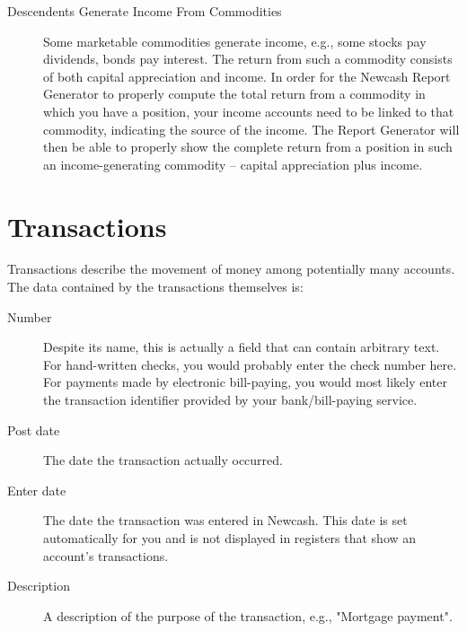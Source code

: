 \documentclass{report}
\begin{document}
\begin{description}
\begin{description}
\item [Descendents Generate Income From Commodities] Some marketable commodities generate income, e.g., some stocks pay dividends, bonds pay interest. The return from such a commodity consists of both capital appreciation and income. In order for the Newcash Report Generator to properly compute the total return from a commodity in which you have a position, your income accounts need to be linked to that commodity, indicating the source of the income. The Report Generator will then be able to properly show the complete return from a position in such an income-generating commodity -- capital appreciation plus income.

\end{description}
\end{description}


\section{Transactions}
Transactions describe the movement of money among potentially many accounts. The data contained by the transactions themselves is:
\begin{description}
\item [Number] Despite its name, this is actually a field that can contain arbitrary text. For hand-written checks, you would probably enter the check number here. For payments made by electronic bill-paying, you would most likely enter the transaction identifier provided by your bank/bill-paying service.
\item [Post date] The date the transaction actually occurred.
\item [Enter date] The date the transaction was entered in Newcash. This date is set automatically for you and is not displayed in registers that show an account's transactions.
\item [Description] A description of the purpose of the transaction, e.g., "Mortgage payment".
\end{description}
\end{document}
